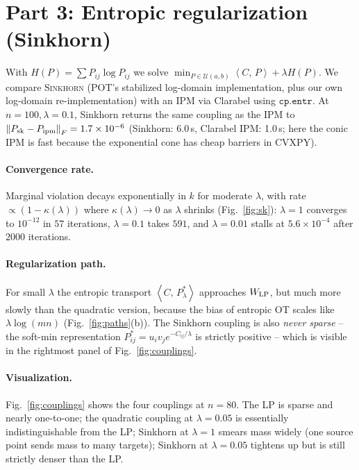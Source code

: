 \documentclass[11pt]{article}
\newcommand{\inner}[2]{\left\langle #1,\,#2 \right\rangle}
\newcommand{\norm}[1]{\left\lVert #1 \right\rVert}
\newcommand{\Pol}{\mathcal{U}(a,b)}
\begin{document}
\section{Part 3: Entropic regularization (Sinkhorn)}
With $H(P)=\sum P_{ij}\log P_{ij}$ we solve
$\min_{P\in\Pol}\inner{C}{P} + \lambda H(P)$. We compare \textsc{Sinkhorn}
(POT's stabilized log-domain implementation, plus our own log-domain
re-implementation) with an \textsc{IPM} via Clarabel using $\mathtt{cp.entr}$.
At $n{=}100,\lambda{=}0.1$, Sinkhorn returns the same coupling as the IPM to
$\norm{P_{\rm sk}-P_{\rm ipm}}_F = 1.7\times 10^{-6}$ (Sinkhorn: 6.0\,s,
Clarabel IPM: 1.0\,s; here the conic IPM is fast because the exponential cone
has cheap barriers in CVXPY).

\paragraph{Convergence rate.} Marginal violation decays exponentially in $k$
for moderate $\lambda$, with rate $\propto(1-\kappa(\lambda))$ where
$\kappa(\lambda)\to 0$ as $\lambda$ shrinks (Fig.~\ref{fig:sk}): $\lambda{=}1$
converges to $10^{-12}$ in $57$ iterations, $\lambda{=}0.1$ takes $591$, and
$\lambda{=}0.01$ stalls at $5.6\times 10^{-4}$ after $2000$ iterations.

\paragraph{Regularization path.} For small $\lambda$ the entropic transport
$\inner{C}{P_\lambda^*}$ approaches $W_{\rm LP}$, but much more slowly than
the quadratic version, because the bias of entropic OT scales like
$\lambda\log(mn)$ (Fig.~\ref{fig:paths}(b)). The Sinkhorn coupling is also
\emph{never sparse} -- the soft-min representation
$P_{ij}^*=u_iv_j e^{-C_{ij}/\lambda}$ is strictly positive -- which is visible
in the rightmost panel of Fig.~\ref{fig:couplings}.

\paragraph{Visualization.} Fig.~\ref{fig:couplings} shows the four couplings
at $n{=}80$. The LP is sparse and nearly one-to-one; the quadratic coupling
at $\lambda{=}0.05$ is essentially indistinguishable from the LP; Sinkhorn at
$\lambda{=}1$ smears mass widely (one source point sends mass to many
targets); Sinkhorn at $\lambda{=}0.05$ tightens up but is still strictly
denser than the LP.
\end{document}
